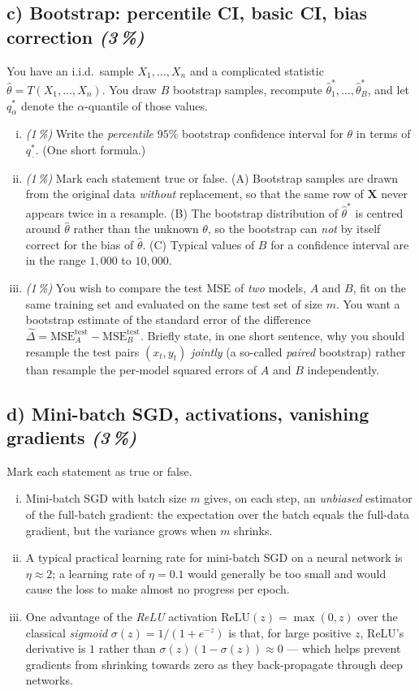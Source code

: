\documentclass[11pt,a4paper]{article}
\newcommand{\subpoints}[1]{\textit{(#1\,\%)}}
\begin{document}
\subsection*{c) Bootstrap: percentile CI, basic CI, bias correction \subpoints{3}}
You have an i.i.d.\ sample $X_1, \dots, X_n$ and a complicated statistic $\hat\theta = T(X_1, \dots, X_n)$. You draw $B$ bootstrap samples, recompute $\hat\theta^*_1, \dots, \hat\theta^*_B$, and let $q_\alpha^*$ denote the $\alpha$-quantile of those values.

\begin{enumerate}[(i)]
  \item \subpoints{1} Write the \emph{percentile} $95\%$ bootstrap confidence interval for $\theta$ in terms of $q_{\,\cdot}^*$. (One short formula.)
  \item \subpoints{1} Mark each statement true or false. (A) Bootstrap samples are drawn from the original data \emph{without} replacement, so that the same row of $\mathbf X$ never appears twice in a resample. (B) The bootstrap distribution of $\hat\theta^*$ is centred around $\hat\theta$ rather than the unknown $\theta$, so the bootstrap can \emph{not} by itself correct for the bias of $\hat\theta$. (C) Typical values of $B$ for a confidence interval are in the range $1{,}000$ to $10{,}000$.
  \item \subpoints{1} You wish to compare the test MSE of \emph{two} models, $A$ and $B$, fit on the same training set and evaluated on the same test set of size $m$. You want a bootstrap estimate of the standard error of the difference $\widehat{\Delta} = \mathrm{MSE}_A^{\text{test}} - \mathrm{MSE}_B^{\text{test}}$. Briefly state, in one short sentence, why you should resample the test pairs $(x_t, y_t)$ \emph{jointly} (a so-called \emph{paired} bootstrap) rather than resample the per-model squared errors of $A$ and $B$ independently.
\end{enumerate}

\subsection*{d) Mini-batch SGD, activations, vanishing gradients \subpoints{3}}
Mark each statement as true or false.
\begin{enumerate}[(i)]
  \item Mini-batch SGD with batch size $m$ gives, on each step, an \emph{unbiased} estimator of the full-batch gradient: the expectation over the batch equals the full-data gradient, but the variance grows when $m$ shrinks.
  \item A typical practical learning rate for mini-batch SGD on a neural network is $\eta \approx 2$; a learning rate of $\eta = 0.1$ would generally be too small and would cause the loss to make almost no progress per epoch.
  \item One advantage of the \emph{ReLU} activation $\mathrm{ReLU}(z) = \max(0, z)$ over the classical \emph{sigmoid} $\sigma(z) = 1/(1 + e^{-z})$ is that, for large positive $z$, ReLU's derivative is $1$ rather than $\sigma(z)(1 - \sigma(z)) \approx 0$ --- which helps prevent gradients from shrinking towards zero as they back-propagate through deep networks.
\end{enumerate}
\end{document}
